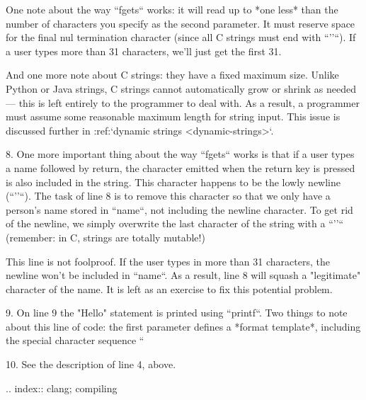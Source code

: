       One note about the way ``fgets`` works: it will read up to *one less* than the number of characters you specify as the second parameter.  It must reserve space for the final nul termination character (since all C strings must end with ``'\0'``).  If a user types more than 31 characters, we'll just get the first 31.  

      And one more note about C strings: they have a fixed maximum size.  Unlike Python or Java strings, C strings cannot automatically grow or shrink as needed --- this is left entirely to the programmer to deal with.  As a result, a programmer must assume some reasonable maximum length for string input.  This issue is discussed further in :ref:`dynamic strings <dynamic-strings>`.


  8.  One more important thing about the way ``fgets`` works is that if a user types a name followed by return, the character emitted when the return key is pressed is also included in the string.  This character happens to be the lowly newline (``'\n'``).  The task of line 8 is to remove this character so that we only have a person's name stored in ``name``, not including the newline character.  To get rid of the newline, we simply overwrite the last character of the string with a ``'\0'`` (remember: in C, strings are totally mutable!)  

      This line is not foolproof.  If the user types in more than 31 characters, the newline won't be included in ``name``.  As a result, line 8 will squash a "legitimate" character of the name.  It is left as an exercise to fix this potential problem.

  9.  On line 9 the "Hello" statement is printed using ``printf``.  Two things to note about this line of code: the first parameter defines a *format template*, including the special character sequence ``%

  10.  See the description of line 4, above.

.. index:: clang; compiling

